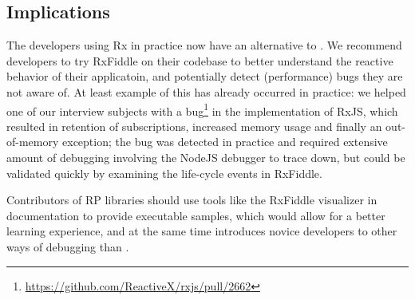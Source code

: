 \subsection{Implications}
The developers using Rx in practice now have an alternative to \printfdebugging{}. 
We recommend developers to try RxFiddle on their codebase to better understand the reactive behavior of their applicatoin, 
and potentially detect (performance) bugs they are not aware of.
At least example of this has already occurred in practice:
we helped one of our interview subjects with a bug\footnote{\url{https://github.com/ReactiveX/rxjs/pull/2662}} in the  implementation of RxJS,
which resulted in retention of subscriptions, increased memory usage and finally an out-of-memory exception;
the bug was detected in practice and required extensive amount of debugging involving the NodeJS debugger to trace down, 
but could be validated quickly by examining the life-cycle events in RxFiddle.

Contributors of RP libraries should use tools like the RxFiddle visualizer in documentation to provide executable samples,
which would allow for a better learning experience, 
and at the same time introduces novice developers to other ways of debugging than \printfdebugging{}.
